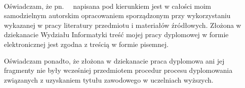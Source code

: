 %


\begin{center}
    \noindent
    {{\color{blueZUT}\Large{}}}\\[1cm]
\end{center}

\noindent Oświadczam, że \degreename {\ }pn.{\ }{\emph \shorttitle}{\ }
napisana pod kierunkiem \supname  {\ }
jest w całości moim samodzielnym autorskim opracowaniem sporządzonym przy wykorzystaniu wykazanej w pracy literatury przedmiotu i materiałów źródłowych.
Złożona w dziekanacie Wydziału Informatyki
treść mojej pracy dyplomowej w formie elektronicznej jest zgodna z treścią w formie pisemnej.

\vspace{0.2cm}

\noindent Oświadczam ponadto, że złożona w dziekanacie praca dyplomowa ani jej fragmenty nie były wcześniej przedmiotem procedur procesu dyplomowania związanych z uzyskaniem tytułu zawodowego w uczelniach wyższych.

\vspace{3.5cm}

\dotfill %

\vspace{1.5cm}

